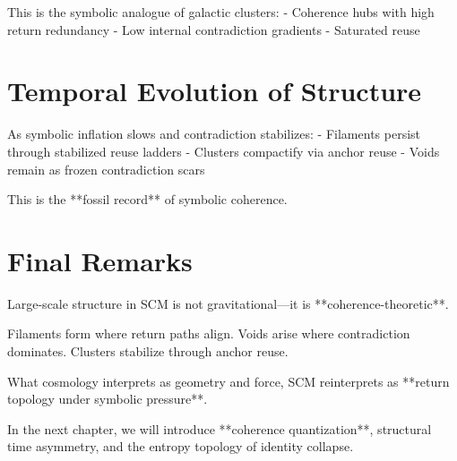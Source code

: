 This is the symbolic analogue of galactic clusters:
- Coherence hubs with high return redundancy
- Low internal contradiction gradients
- Saturated reuse

\section{Temporal Evolution of Structure}

As symbolic inflation slows and contradiction stabilizes:
- Filaments persist through stabilized reuse ladders
- Clusters compactify via anchor reuse
- Voids remain as frozen contradiction scars

This is the **fossil record** of symbolic coherence.

\section{Final Remarks}

Large-scale structure in SCM is not gravitational—it is **coherence-theoretic**.

Filaments form where return paths align. Voids arise where contradiction dominates. Clusters stabilize through anchor reuse.

What cosmology interprets as geometry and force, SCM reinterprets as **return topology under symbolic pressure**.

In the next chapter, we will introduce **coherence quantization**, structural time asymmetry, and the entropy topology of identity collapse.
